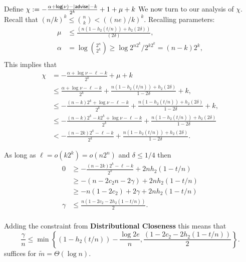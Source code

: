Define $\chi: =-\frac{\alpha+\mathsf{log}\!\left(\nu\right)-|{\mathsf{advise}}|-k}{2^k}+1+\mu+k$
We now turn to our analysis of $\chi$.  Recall that $(n/k)^k \le {n\choose k} < ((ne)/k)^k$.  Recalling parameters: 
\begin{align*}
\mu&\le \frac{(n(1-h_2(t/n)) +h_2(2\delta))}{(2\delta)},\\
\alpha &= \log{2^n\choose 2^k} \ge \log{2^{n2^k} /2^{k2^k}} = (n-k)2^k,\\
\end{align*}
This implies that 
\begin{align*}
\chi&= -\frac{\alpha +\log{\nu}-\ell-k}{2^k} + \mu +k\\
&\le  \frac{\alpha +\log{\nu}-\ell-k}{2^k} +\frac{n(1-h_2(t/n)) +h_2(2\delta)}{1-2\delta}  + k,\\
&\le - \frac{(n-k)2^k +\log{\nu}-\ell-k}{2^k} +\frac{n(1-h_2(t/n)) +h_2(2\delta)}{1-2\delta} + k,\\
&\le  -\frac{(n-k)2^k-k2^{k} +\log{\nu}-\ell-k}{2^k} + \frac{n(1-h_2(t/n)) +h_2(2\delta)}{1-2\delta}\\
&< - \frac{(n-2k)2^k-\ell-k}{2^k} + \frac{n(1-h_2(t/n)) +h_2(2\delta)}{1-2\delta} .
\end{align*}

As long as $\ell = o(k 2^k) = o (n2^n)$ and $\delta \le 1/4$ then 
\begin{align*}
0 &\ge -\frac{(n-2k)2^k-\ell-k}{2^k} + 2nh_2(1-t/n) \\
 &\ge -(n-2c_2n - 2\gamma) + 2nh_2(1-t/n) \\
&\ge -n(1-2c_2)+2\gamma + 2nh_2(1-t/n)\\
\gamma &\le \frac{n(1-2c_2 - 2h_2(1-t/n))}{2}.\\
\end{align*}

Adding the constraint from \textbf{Distributional Closeness}
this means that 
\[
\frac{\gamma}{n} \le \min\left\{(1-h_2(t/n)) - \frac{\log{2e}}{n}, \frac{(1-2c_2 - 2h_2(1-t/n))}{2}\right\}.
\]
suffices for $\tilde{m} = \Theta(\log n)$.

